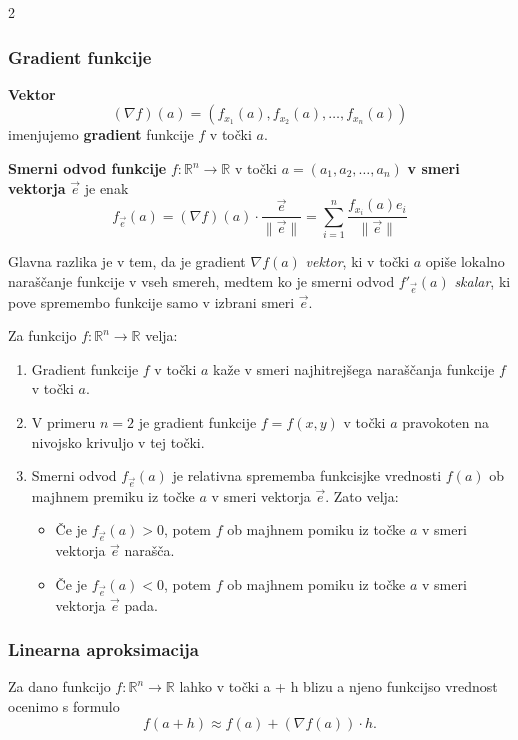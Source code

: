 \documentclass{article}
\begin{document}
\begin{multicols}{2}
	\subsubsection{Gradient funkcije}

	\textbf{Vektor}
	\[
		(\nabla f)(a) = (f_{x_1}(a), f_{x_2}(a), \ldots, f_{x_n}(a))
	\]
	imenjujemo \textbf{gradient} funkcije \( f \) v točki \( a \).

	\textbf{Smerni odvod funkcije} \( f: \mathbb{R}^n \rightarrow \mathbb{R} \) v točki \( a = (a_1, a_2, \ldots, a_n) \) \textbf{v smeri vektorja} \( \vec{e} \) je enak
	\[
		f_{\vec{e}}(a) = (\nabla f)(a) \cdot \frac{\vec{e}}{\| \vec{e} \|} = \sum_{i=1}^n \frac{f_{x_i}(a) e_i}{\| \vec{e} \|}
	\]

	Glavna razlika je v tem, da je gradient $\nabla f(a)$ \emph{vektor}, ki v točki $a$ opiše lokalno naraščanje funkcije v vseh smereh,
	medtem ko je smerni odvod $f'_{\vec e}(a)$ \emph{skalar}, ki pove spremembo funkcije samo v izbrani smeri $\vec e$.

	Za funkcijo \( f: \mathbb{R}^n \rightarrow \mathbb{R} \) velja:
	\begin{enumerate}
		\item Gradient funkcije \( f \) v točki \( a \) kaže v smeri najhitrejšega naraščanja funkcije \( f \) v točki \( a \).
		\item V primeru \( n = 2 \) je gradient funkcije \( f = f(x, y) \) v točki \( a \) pravokoten na nivojsko krivuljo v tej točki.
		\item Smerni odvod \( f_{\vec{e}}(a) \) je relativna sprememba funkcisjke vrednosti \( f(a) \) ob majhnem premiku iz točke \( a \) v smeri vektorja \( \vec{e} \). Zato velja:
		      \begin{itemize}
			      \item Če je \( f_{\vec{e}}(a) > 0 \), potem \( f \) ob majhnem pomiku iz točke \( a \) v smeri vektorja \( \vec{e} \) narašča.
			      \item Če je \( f_{\vec{e}}(a) < 0 \), potem \( f \) ob majhnem pomiku iz točke \( a \) v smeri vektorja \( \vec{e} \) pada.
		      \end{itemize}
	\end{enumerate}

	\subsubsection{Linearna aproksimacija}
	Za dano funkcijo \( f: \mathbb{R}^n \rightarrow \mathbb{R} \) lahko v točki a + h blizu a njeno funkcijso vrednost ocenimo s formulo
	\[
		f(a + h) \approx f(a) + (\nabla f(a)) \cdot h.
	\]



\end{multicols}
\end{document}
